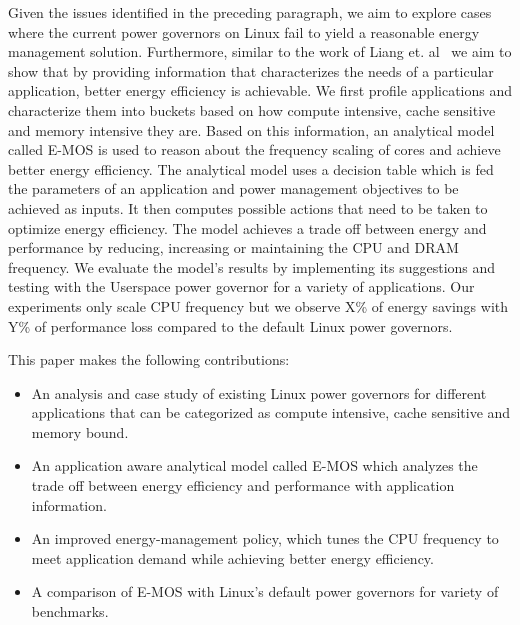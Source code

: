 Given the issues identified in the preceding paragraph, we aim to explore cases where the current power governors on Linux fail to yield a reasonable energy management solution. 
Furthermore, similar to the work of Liang et. al~\cite{and-dvfs} we aim to show that by providing information that characterizes the needs of a particular application, 
better energy efficiency is achievable. We first profile applications and characterize them into buckets based on how compute intensive, cache sensitive and memory intensive they are. 
Based on this information, an analytical model called E-MOS is used to reason about the frequency scaling of cores and achieve better energy efficiency. 
The analytical model uses a decision table which is fed the parameters of an application and power management objectives to be achieved as inputs.
It then computes possible actions that need to be taken to optimize energy efficiency.
The model achieves a trade off between energy and performance by reducing, increasing or maintaining the CPU and DRAM frequency. 
We evaluate the model's results by implementing its suggestions and testing with the Userspace power governor for a variety of applications. Our experiments only scale CPU frequency but we 
observe X\% of energy savings with Y\% of performance loss compared to the default Linux power governors.

This paper makes the following contributions:
\begin{itemize}
\item  An analysis and case study of existing Linux power governors for different applications that can be categorized as compute intensive, cache sensitive and memory bound. 
\item  An application aware analytical model called E-MOS which analyzes the trade off between energy efficiency and performance with application information.
\item  An improved energy-management policy, which tunes the CPU frequency to meet application demand while achieving better energy efficiency.
\item  A comparison of E-MOS with Linux's default power governors for variety of benchmarks.
\end{itemize}

